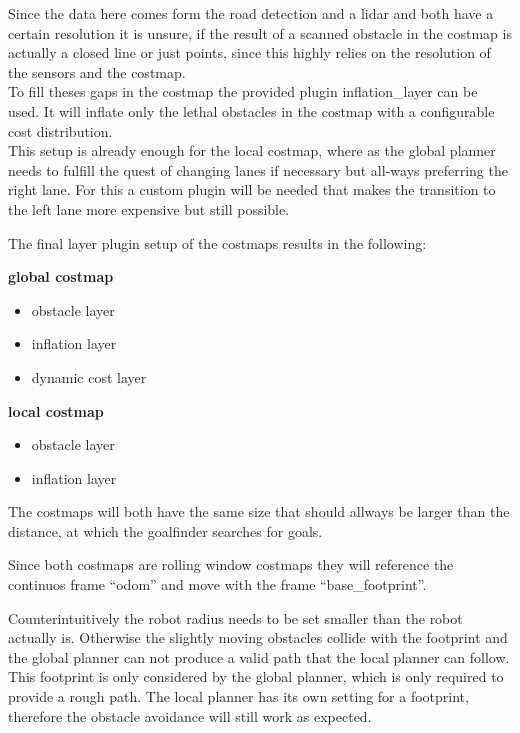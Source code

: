 Since the data here comes form the road detection and a lidar and both have a certain resolution it is unsure, if the result of a scanned obstacle in the costmap is actually a closed line or just points, since this highly relies on the resolution of the sensors and the costmap.\\

To fill theses gaps in the costmap the provided plugin inflation\_layer can be used. It will inflate only the lethal obstacles in the costmap with a configurable cost distribution.\\

This setup is already enough for the local costmap, where as the global planner needs to fulfill the quest of changing lanes if necessary but all-ways preferring the right lane. For this a custom plugin will be needed that makes the transition to the left lane more expensive but still possible.


The final layer plugin setup of the costmaps results in the following:

\textbf{global costmap}
\begin{itemize}
	\item obstacle layer
	\item inflation layer
	\item dynamic cost layer
\end{itemize}


\textbf{local costmap}
\begin{itemize}
	\item obstacle layer
	\item inflation layer
\end{itemize}

The costmaps will both have the same size that should allways be larger than the distance, at which the goalfinder searches for goals.

Since both costmaps are rolling window costmaps they will reference the continuos frame ``odom'' and move with the frame ``base\_footprint''.

Counterintuitively the robot radius needs to be set smaller than the robot actually is. Otherwise the slightly moving obstacles collide with the footprint and the global planner can not produce a valid path that the local planner can follow.\\
This footprint is only considered by the global planner, which is only required to provide a rough path. The local planner has its own setting for a footprint, therefore the obstacle avoidance will still work as expected.

